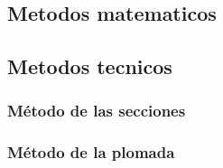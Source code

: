 \documentclass[16pt,]{krantz}
\theoremstyle{definition}
\theoremstyle{definition}
\theoremstyle{definition}
\theoremstyle{definition}
\theoremstyle{remark}
\begin{document}
\hypertarget{metodos-matematicos-1}{%
\subsection{Metodos matematicos}\label{metodos-matematicos-1}}

\hypertarget{metodos-tecnicos-1}{%
\subsection{Metodos tecnicos}\label{metodos-tecnicos-1}}

\hypertarget{muxe9todo-de-las-secciones}{%
\subsubsection{Método de las secciones}\label{muxe9todo-de-las-secciones}}

\hypertarget{muxe9todo-de-la-plomada-1}{%
\subsubsection{Método de la plomada}\label{muxe9todo-de-la-plomada-1}}



\printindex
\end{document}
